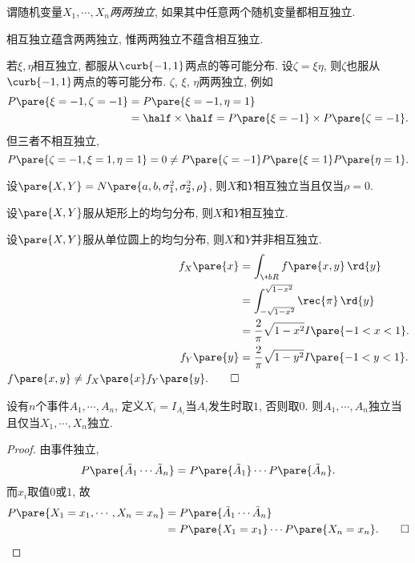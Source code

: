 \documentclass[../Statistics.tex]{subfiles}
\begin{document}
谓随机变量$X_1,\cdots,X_n$\emph{两两独立}, 如果其中任意两个随机变量都相互独立.
\begin{pitfall}
    相互独立蕴含两两独立, 惟两两独立不蕴含相互独立.
\end{pitfall}
\begin{sample}
    \begin{ex}
        若$\xi,\eta$相互独立, 都服从$\curb{-1,1}$两点的等可能分布. 设$\zeta = \xi\eta$, 则$\zeta$也服从$\curb{-1,1}$两点的等可能分布. $\zeta$, $\xi$, $\eta$两两独立, 例如
        \begin{align*}
            P\pare{\xi = -1, \zeta = -1} &= P\pare{\xi=-1, \eta = 1}\\ &= \half\times\half = P\pare{\xi = -1}\times P\pare{\zeta = -1}. 
        \end{align*}
        但三者不相互独立,
        \[ P\pare{\zeta = -1, \xi = 1, \eta = 1} = 0 \neq P\pare{\zeta = -1}P\pare{\xi = 1}P\pare{\eta = 1}. \]
    \end{ex}
\end{sample}
\begin{sample}
    \begin{ex}
        设$\pare{X,Y} = N\pare{a,b,\sigma_1^2,\sigma_2^2,\rho}$, 则$X$和$Y$相互独立当且仅当$\rho = 0$.
    \end{ex}
    \begin{ex}
        设$\pare{X,Y}$服从矩形上的均匀分布, 则$X$和$Y$相互独立.
    \end{ex}
    \begin{ex}
        设$\pare{X,Y}$服从单位圆上的均匀分布, 则$X$和$Y$并非相互独立.
        \begin{align*}
            f_X\pare{x} &= \int_{\+bR} f\pare{x,y}\,\rd{y} \\
            &= \int_{-\sqrt{1-x^2}}^{\sqrt{1-x^2}} \rec{\pi}\,\rd{y} \\
            &= \frac{2}{\pi} \sqrt{1-x^2} I\pare{-1<x<1}. \\
            f_Y\pare{y} &= \frac{2}{\pi} \sqrt{1-y^2} I\pare{-1<y<1}. \\
            f\pare{x,y}\neq f_X\pare{x}f_Y\pare{y}.\qedhere
        \end{align*}
    \end{ex}
    \begin{ex}
        设有$n$个事件$A_1,\cdots,A_n$, 定义$X_i = I_{A_i}$当$A_i$发生时取$1$, 否则取$0$. 则$A_1,\cdots,A_n$独立当且仅当$X_1,\cdots,X_n$独立.
    \end{ex}
    \begin{proof}
        由事件独立,
        \[ P\pare{\tilde{A}_1\cdots\tilde{A}_n} = P\pare{\tilde{A}_1}\cdots P\pare{\tilde{A}_n}. \]
        而$x_i$取值$0$或$1$, 故
        \begin{align*}
            P\pare{X_1=x_1, \cdots, X_n=x_n} &= P\pare{\tilde{A}_1\cdots\tilde{A}_n}\\ &= P\pare{X_1=x_1}\cdots P\pare{X_n=x_n}.\qedhere
        \end{align*}
    \end{proof}
\end{sample}
\end{document}
